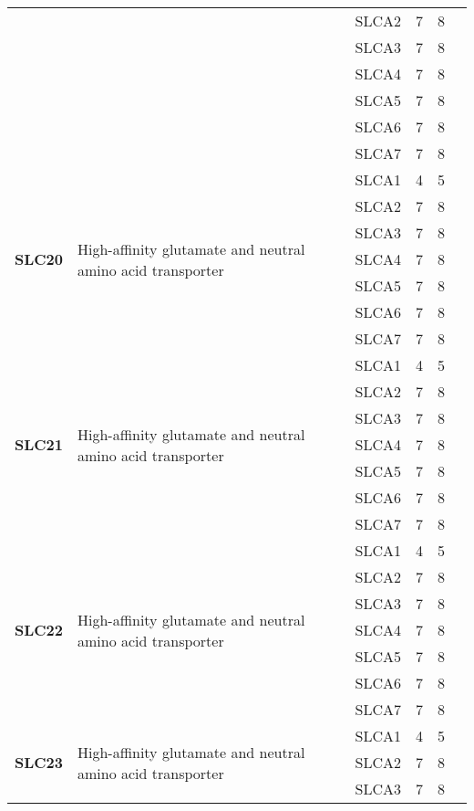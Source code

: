 \documentclass[12pt]{report}
\begin{document}
\begin{center}
\begin{longtable}{|p{1.5cm}|p{3.2cm}|p{1.9cm}|p{1.65cm}|p{3cm}|p{3cm}|}
\cline{3-6}
&&SLCA2&7 & 8&\\ 
\cline{3-6}
&&SLCA3&7 & 8&\\ 
\cline{3-6}
&&SLCA4&7 & 8&\\ 
\cline{3-6}
&&SLCA5&7 & 8&\\ 
\cline{3-6}
&&SLCA6&7 & 8&\\ 
\cline{3-6}
&&SLCA7&7 & 8&\\ 
\hline
\multirow{7}{1.5cm}{\textbf{SLC20}} & \multirow{7}{4cm}{High-affinity glutamate and neutral amino acid transporter} & SLCA1 & 4 & 5\\ 
\cline{3-6}
&&SLCA2&7 & 8&\\ 
\cline{3-6}
&&SLCA3&7 & 8&\\ 
\cline{3-6}
&&SLCA4&7 & 8&\\ 
\cline{3-6}
&&SLCA5&7 & 8&\\ 
\cline{3-6}
&&SLCA6&7 & 8&\\ 
\cline{3-6}
&&SLCA7&7 & 8&\\ 
\hline
\multirow{7}{1.5cm}{\textbf{SLC21}} & \multirow{7}{4cm}{High-affinity glutamate and neutral amino acid transporter} & SLCA1 & 4 & 5\\ 
\cline{3-6}
&&SLCA2&7 & 8&\\ 
\cline{3-6}
&&SLCA3&7 & 8&\\ 
\cline{3-6}
&&SLCA4&7 & 8&\\ 
\cline{3-6}
&&SLCA5&7 & 8&\\ 
\cline{3-6}
&&SLCA6&7 & 8&\\ 
\cline{3-6}
&&SLCA7&7 & 8&\\ 
\hline
\multirow{7}{1.5cm}{\textbf{SLC22}} & \multirow{7}{4cm}{High-affinity glutamate and neutral amino acid transporter} & SLCA1 & 4 & 5\\ 
\cline{3-6}
&&SLCA2&7 & 8&\\ 
\cline{3-6}
&&SLCA3&7 & 8&\\ 
\cline{3-6}
&&SLCA4&7 & 8&\\ 
\cline{3-6}
&&SLCA5&7 & 8&\\ 
\cline{3-6}
&&SLCA6&7 & 8&\\ 
\cline{3-6}
&&SLCA7&7 & 8&\\ 
\hline
\multirow{7}{1.5cm}{\textbf{SLC23}} & \multirow{7}{4cm}{High-affinity glutamate and neutral amino acid transporter} & SLCA1 & 4 & 5\\ 
\cline{3-6}
&&SLCA2&7 & 8&\\ 
\cline{3-6}
&&SLCA3&7 & 8&\\ 

\end{longtable}
\end{center}
\end{document}
